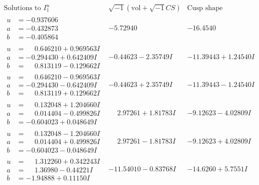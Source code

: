 \documentclass[1p]{elsarticle_modified}
\theoremstyle{definition}
\newcommand{\I}{\sqrt{-1}}
\begin{document}
$$\begin{array}{c|c|c}  
\text{Solutions to }I^u_{1}& \I (\text{vol} + \sqrt{-1}CS) & \text{Cusp shape}\\
 \hline 
\begin{aligned}
u &= -0.937606\phantom{ +0.000000I} \\
a &= -0.432873\phantom{ +0.000000I} \\
b &= -0.405864\phantom{ +0.000000I}\end{aligned}
 & -5.72940\phantom{ +0.000000I} & -16.4540\phantom{ +0.000000I} \\ \hline\begin{aligned}
u &= \phantom{-}0.646210 + 0.969563 I \\
a &= -0.294430 + 0.642409 I \\
b &= \phantom{-}0.813119 - 0.129662 I\end{aligned}
 & -0.44623 - 2.35749 I & -11.39443 + 1.24540 I \\ \hline\begin{aligned}
u &= \phantom{-}0.646210 - 0.969563 I \\
a &= -0.294430 - 0.642409 I \\
b &= \phantom{-}0.813119 + 0.129662 I\end{aligned}
 & -0.44623 + 2.35749 I & -11.39443 - 1.24540 I \\ \hline\begin{aligned}
u &= \phantom{-}0.132048 + 1.204660 I \\
a &= \phantom{-}0.014404 - 0.499826 I \\
b &= -0.604023 + 0.048649 I\end{aligned}
 & \phantom{-}2.97261 + 1.81783 I & -9.12623 - 4.02809 I \\ \hline\begin{aligned}
u &= \phantom{-}0.132048 - 1.204660 I \\
a &= \phantom{-}0.014404 + 0.499826 I \\
b &= -0.604023 - 0.048649 I\end{aligned}
 & \phantom{-}2.97261 - 1.81783 I & -9.12623 + 4.02809 I \\ \hline\begin{aligned}
u &= \phantom{-}1.312260 + 0.342243 I \\
a &= \phantom{-}1.36980 - 0.44221 I \\
b &= -1.94888 + 0.11150 I\end{aligned}
 & -11.54010 - 0.83768 I & -14.6260 + 5.7551 I \\ \hline\begin{aligned}

\end{aligned}
\end{array}$$
\end{document}
